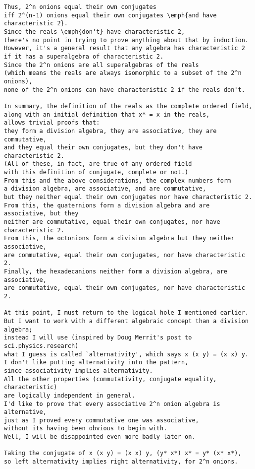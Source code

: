 \begin{verbatim}
Thus, 2^n onions equal their own conjugates
iff 2^(n-1) onions equal their own conjugates \emph{and have characteristic 2}.
Since the reals \emph{don't} have characteristic 2,
there's no point in trying to prove anything about that by induction.
However, it's a general result that any algebra has characteristic 2
if it has a superalgebra of characteristic 2.
Since the 2^n onions are all superalgebras of the reals
(which means the reals are always isomorphic to a subset of the 2^n onions),
none of the 2^n onions can have characteristic 2 if the reals don't.

In summary, the definition of the reals as the complete ordered field,
along with an initial definition that x* = x in the reals,
allows trivial proofs that:
they form a division algebra, they are associative, they are commutative,
and they equal their own conjugates, but they don't have characteristic 2.
(All of these, in fact, are true of any ordered field
with this definition of conjugate, complete or not.)
From this and the above considerations, the complex numbers form
a division algebra, are associative, and are commutative,
but they neither equal their own conjugates nor have characteristic 2.
From this, the quaternions form a division algebra and are associative, but they
neither are commutative, equal their own conjugates, nor have characteristic 2.
From this, the octonions form a division algebra but they neither associative,
are commutative, equal their own conjugates, nor have characteristic 2.
Finally, the hexadecanions neither form a division algebra, are associative,
are commutative, equal their own conjugates, nor have characteristic 2.

At this point, I must return to the logical hole I mentioned earlier.
But I want to work with a different algebraic concept than a division algebra;
instead I will use (inspired by Doug Merrit's post to sci.physics.research)
what I guess is called `alternativity', which says x (x y) = (x x) y.
I don't like putting alternativity into the pattern,
since associativity implies alternativity.
All the other properties (commutativity, conjugate equality, characteristic)
are logically independent in general.
I'd like to prove that every associative 2^n onion algebra is alternative,
just as I proved every commutative one was associative,
without its having been obvious to begin with.
Well, I will be disappointed even more badly later on.

Taking the conjugate of x (x y) = (x x) y, (y* x*) x* = y* (x* x*),
so left alternativity implies right alternativity, for 2^n onions.


\end{verbatim}
